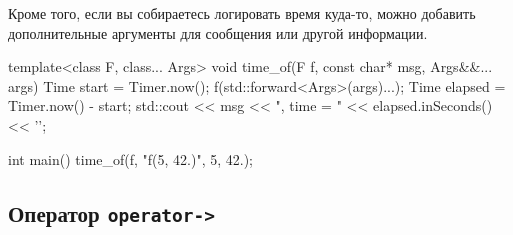 Кроме того, если вы собираетесь логировать время куда-то, можно добавить дополнительные аргументы для сообщения или другой информации.
\begin{cppcode}
template<class F, class... Args>
void time_of(F f, const char* msg, Args&&... args) {
  Time start = Timer.now();
  f(std::forward<Args>(args)...);
  Time elapsed = Timer.now() - start;
  std::cout << msg << ", time = " << elapsed.inSeconds() << '\n';
}

int main() {
  time_of(f, "f(5, 42.)", 5, 42.);
}
\end{cppcode}

\subsection{Оператор \texttt{operator->}}
\label{section::OperatorArrow}

